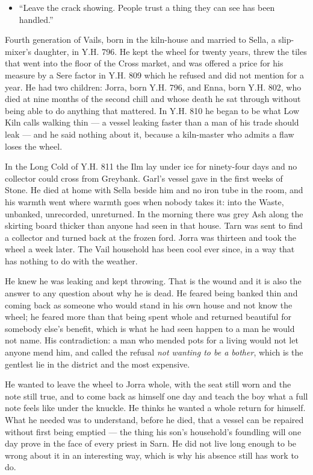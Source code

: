 \documentclass{design/chronicle}
\begin{document}
{\begin{itemize}[leftmargin=1.4em,itemsep=1pt,topsep=3pt,parsep=0pt]
\item “Leave the crack showing. People trust a thing they can see has been handled.”

\end{itemize}

Fourth generation of Vails, born in the kiln-house and married to Sella, a slip-mixer’s daughter, in Y.H. 796. He kept the wheel for twenty years, threw the tiles that went into the floor of the Cross market, and was offered a price for his measure by a Sere factor in Y.H. 809 which he refused and did not mention for a year. He had two children: Jorra, born Y.H. 796, and Enna, born Y.H. 802, who died at nine months of the second chill and whose death he sat through without being able to do anything that mattered. In Y.H. 810 he began to be what Low Kiln calls walking thin — a vessel leaking faster than a man of his trade should leak — and he said nothing about it, because a kiln-master who admits a flaw loses the wheel.

In the Long Cold of Y.H. 811 the Ilm lay under ice for ninety-four days and no collector could cross from Greybank. Garl’s vessel gave in the first weeks of Stone. He died at home with Sella beside him and no iron tube in the room, and his warmth went where warmth goes when nobody takes it: into the Waste, unbanked, unrecorded, unreturned. In the morning there was grey Ash along the skirting board thicker than anyone had seen in that house. Tarn was sent to find a collector and turned back at the frozen ford. Jorra was thirteen and took the wheel a week later. The Vail household has been cool ever since, in a way that has nothing to do with the weather.

He knew he was leaking and kept throwing. That is the wound and it is also the answer to any question about why he is dead. He feared being banked thin and coming back as someone who would stand in his own house and not know the wheel; he feared more than that being spent whole and returned beautiful for somebody else’s benefit, which is what he had seen happen to a man he would not name. His contradiction: a man who mended pots for a living would not let anyone mend him, and called the refusal \emph{not wanting to be a bother}, which is the gentlest lie in the district and the most expensive.

He wanted to leave the wheel to Jorra whole, with the seat still worn and the note still true, and to come back as himself one day and teach the boy what a full note feels like under the knuckle. He thinks he wanted a whole return for himself. What he needed was to understand, before he died, that a vessel can be repaired without first being emptied — the thing his son’s household’s foundling will one day prove in the face of every priest in Sarn. He did not live long enough to be wrong about it in an interesting way, which is why his absence still has work to do.

}
\end{document}
